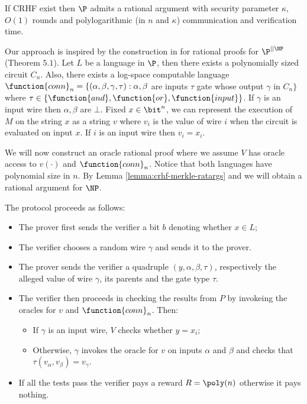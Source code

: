 \newcommand{\conn}{\function{conn}_n}
\begin{theorem}
	\label{thm:crhf-p}
	If CRHF exist then $\P$ admits a rational argument with security parameter $\kappa$, $O(1)$ rounds and polylogarithmic (in $n$ and $\kappa$) communication and verification time.
\end{theorem}
\begin{proofsketch}
	Our approach is inspired by the construction in \cite{am1} for rational proofs for $\P^{||\NP}$ (Theorem $5.1$). Let $L$ be a language in $\P$, then there exists a polynomially sized circuit $C_n$. Also, there exists a log-space computable language
	$\conn = \{ (\alpha, \beta, \gamma, \tau) : \alpha, \beta $ are inputs  $\tau$ gate whose output $\gamma$ in  $C_n \}$ where
	$\tau \in \{ \function{and}, \function{or}, \function{input} \}$. If $\gamma$ is an input wire then $\alpha, \beta$ are $\bot$.
	Fixed $x \in \bit^n$, we can represent the execution of $M$ on the string $x$ as a string $v$ where $v_{i}$ is the value of wire $i$ when the circuit is evaluated on input $x$. If $i$ is an input wire then $v_i = x_i$.
	
	We will now construct an oracle rational proof where we assume $V$ has oracle access to $v(\cdot)$ and $\conn$. Notice that both languages have polynomial size in $n$.
	By Lemma \ref{lemma:crhf-merkle-ratargs} and we will obtain a rational argument for $\NP$.
	
	The protocol proceeds as follows:
	\begin{itemize}
		\item The prover first sends the verifier a bit $b$ denoting whether $x \in L$;
		\item The verifier chooses a random wire $\gamma$ and sends it to the prover.
		\item The prover sends the verifier a quadruple $(y, \alpha, \beta, \tau)$, respectively the alleged value of wire $\gamma$, its parents and the gate type $\tau$.
		\item The verifier then proceeds in checking the results from $P$ by invokeing the oracles for $v$  and $\conn$. Then:
		\begin{itemize}
			\item If $\gamma$ is an input wire, $V$ checks whether $y = x_i$;
			\item Otherwise, $\gamma$ invokes the oracle for $v$ on inputs $\alpha$ and $\beta$ and checks that $\tau(v_\alpha, v_\beta) = v_\gamma$.
		\end{itemize}
		\item If all the tests pass the verifier pays a reward $R = \poly(n)$ otherwise it pays nothing.
	\end{itemize}
	

\end{proofsketch}
